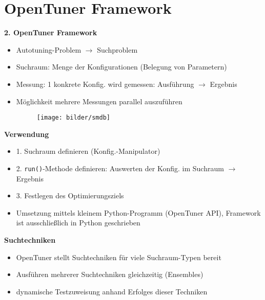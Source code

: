   \section{OpenTuner Framework}
  
  



  
  \begin{frame}
  
  \textbf{2. OpenTuner Framework}
  \begin{itemize}
    \item Autotuning-Problem $\rightarrow$ Suchproblem
    \item Suchraum: Menge der Konfigurationen (Belegung von Parametern)
    \item Messung: 1 konkrete Konfig. wird gemessen: Ausführung $\rightarrow$ Ergebnis
    \item Möglichkeit mehrere Messungen parallel auszuführen
    
    \begin{figure}[ht]
      \centering	      
      \texttt{[image: bilder/smdb]}
      \label{smdb}
    \end{figure}

  \end{itemize}
  \end{frame}
    

  \begin{frame}
  \textbf{Verwendung}
  \begin{itemize}
    \item 1. Suchraum definieren (Konfig.-Manipulator)
    \item 2. \texttt{run()}-Methode definieren: Auswerten der Konfig. im Suchraum $\rightarrow$ Ergebnis
    \item 3. Festlegen des Optimierungsziels
    \item Umsetzung mittels kleinem Python-Programm (OpenTuner API), Framework ist ausschließlich in 
    Python geschrieben
  \end{itemize}
  \textbf{Suchtechniken}
  \begin{itemize}
    \item OpenTuner stellt Suchtechniken für viele Suchraum-Typen bereit
    \item Ausführen mehrerer Suchtechniken gleichzeitig (Ensembles)
    \item dynamische Testzuweisung anhand Erfolges dieser Techniken
  \end{itemize}
  \end{frame}
  

